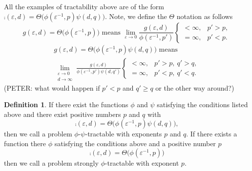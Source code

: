 \documentclass{article}
\theoremstyle{definition}
\newtheorem{definition}{Definition}
\newcommand{\peter}[1]{\begingroup\color{purple}#1\endgroup}
\begin{document}
All the examples of tractability above are of the form $\comp(\varepsilon, d) = \Theta \bigl( \phi(\varepsilon^{-1},p) \psi(d,q)\bigr)$.  Note, we define the $\Theta$ notation as follows
\begin{equation*}
     g(\varepsilon,d) = \Theta\bigl(\phi(\varepsilon^{-1},p) \bigr) \text{ means } 
    \lim_{\varepsilon \to 0} \frac{g(\varepsilon,d)}{\phi(\varepsilon^{-1},p')}
           \begin{cases} < \infty, & p'> p,  \\ 
          =\infty, & p' < p.\end{cases}
\end{equation*}
\begin{multline*}
     g(\varepsilon,d) = \Theta\bigl(\phi(\varepsilon^{-1},p) \psi(d,q) \bigr) \text{ means } \\
    \lim_{\substack{\varepsilon \to 0 \\ d \to \infty}} \frac{g(\varepsilon,d)}{\phi(\varepsilon^{-1},p') \psi(d,q')}
          \begin{cases} < \infty, & p'> p, \  q' > q,  \\ 
          =\infty, & p' < p, \ q' < q.\end{cases}
\end{multline*}
\peter{(PETER: what would happen if $p'<p$ and $q'\ge q$ or the other way around?)}

\begin{definition}
If there exist the functions $\phi$ and $\psi$ satisfying the conditions listed above and there exist positive numbers $p$ and $q$ with
\[
\comp(\varepsilon, d)  = \Theta\bigl(\phi(\varepsilon^{-1},p) \psi(d,q) \bigr),
\]
then we call a problem $\phi$-$\psi$-tractable with exponents $p$ and $q$.  If there exists a function there $\phi$ satisfying the conditions above and a positive number $p$
\[
\comp(\varepsilon, d)  = \Theta\bigl(\phi(\varepsilon^{-1},p) \bigr)
\]
then we call a problem strongly $\phi$-tractable with exponent $p$.
\end{definition}
\end{document}
